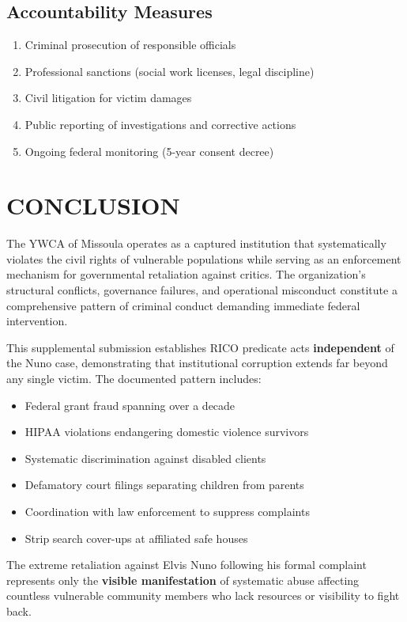 \documentclass[12pt,oneside]{article}
\begin{document}
\subsection*{Accountability Measures}

\begin{enumerate}
\item Criminal prosecution of responsible officials
\item Professional sanctions (social work licenses, legal discipline)
\item Civil litigation for victim damages
\item Public reporting of investigations and corrective actions
\item Ongoing federal monitoring (5-year consent decree)
\end{enumerate}

\section*{CONCLUSION}

The YWCA of Missoula operates as a captured institution that systematically violates the civil rights of vulnerable populations while serving as an enforcement mechanism for governmental retaliation against critics. The organization's structural conflicts, governance failures, and operational misconduct constitute a comprehensive pattern of criminal conduct demanding immediate federal intervention.

This supplemental submission establishes RICO predicate acts \textbf{independent} of the Nuno case, demonstrating that institutional corruption extends far beyond any single victim. The documented pattern includes:

\begin{itemize}
\item Federal grant fraud spanning over a decade
\item HIPAA violations endangering domestic violence survivors
\item Systematic discrimination against disabled clients
\item Defamatory court filings separating children from parents
\item Coordination with law enforcement to suppress complaints
\item Strip search cover-ups at affiliated safe houses
\end{itemize}

The extreme retaliation against Elvis Nuno following his formal complaint represents only the \textbf{visible manifestation} of systematic abuse affecting countless vulnerable community members who lack resources or visibility to fight back.
\end{document}

